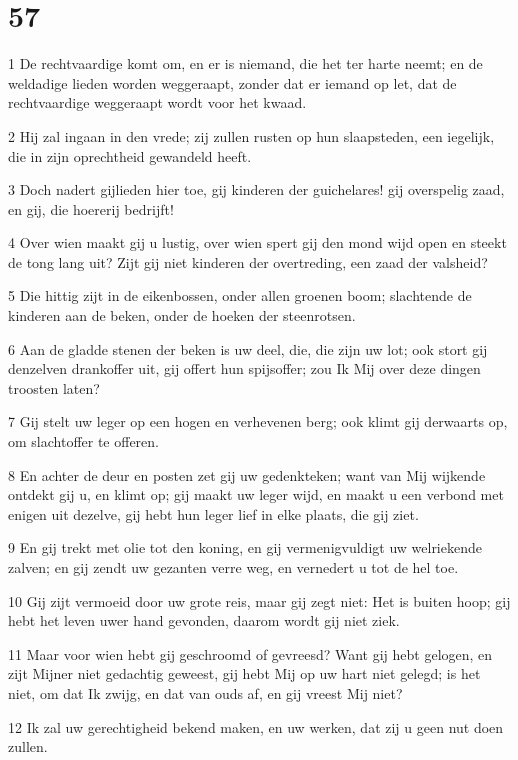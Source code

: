 \chapter{57}

\par 1 De rechtvaardige komt om, en er is niemand, die het ter harte neemt; en de weldadige lieden worden weggeraapt, zonder dat er iemand op let, dat de rechtvaardige weggeraapt wordt voor het kwaad.
\par 2 Hij zal ingaan in den vrede; zij zullen rusten op hun slaapsteden, een iegelijk, die in zijn oprechtheid gewandeld heeft.
\par 3 Doch nadert gijlieden hier toe, gij kinderen der guichelares! gij overspelig zaad, en gij, die hoererij bedrijft!
\par 4 Over wien maakt gij u lustig, over wien spert gij den mond wijd open en steekt de tong lang uit? Zijt gij niet kinderen der overtreding, een zaad der valsheid?
\par 5 Die hittig zijt in de eikenbossen, onder allen groenen boom; slachtende de kinderen aan de beken, onder de hoeken der steenrotsen.
\par 6 Aan de gladde stenen der beken is uw deel, die, die zijn uw lot; ook stort gij denzelven drankoffer uit, gij offert hun spijsoffer; zou Ik Mij over deze dingen troosten laten?
\par 7 Gij stelt uw leger op een hogen en verhevenen berg; ook klimt gij derwaarts op, om slachtoffer te offeren.
\par 8 En achter de deur en posten zet gij uw gedenkteken; want van Mij wijkende ontdekt gij u, en klimt op; gij maakt uw leger wijd, en maakt u een verbond met enigen uit dezelve, gij hebt hun leger lief in elke plaats, die gij ziet.
\par 9 En gij trekt met olie tot den koning, en gij vermenigvuldigt uw welriekende zalven; en gij zendt uw gezanten verre weg, en vernedert u tot de hel toe.
\par 10 Gij zijt vermoeid door uw grote reis, maar gij zegt niet: Het is buiten hoop; gij hebt het leven uwer hand gevonden, daarom wordt gij niet ziek.
\par 11 Maar voor wien hebt gij geschroomd of gevreesd? Want gij hebt gelogen, en zijt Mijner niet gedachtig geweest, gij hebt Mij op uw hart niet gelegd; is het niet, om dat Ik zwijg, en dat van ouds af, en gij vreest Mij niet?
\par 12 Ik zal uw gerechtigheid bekend maken, en uw werken, dat zij u geen nut doen zullen.
